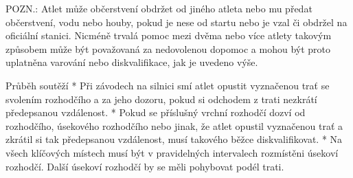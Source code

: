   POZN.: Atlet může občerstvení obdržet od jiného atleta nebo mu předat občerstvení, vodu nebo houby, pokud je nese od startu nebo je vzal či obdržel na oficiální stanici. Nicméně trvalá pomoc mezi dvěma nebo více atlety takovým způsobem může být považovaná za nedovolenou dopomoc a mohou být proto uplatněna varování nebo diskvalifikace, jak je uvedeno výše.
  \enditems

Průběh soutěží
* Při závodech na silnici smí atlet opustit vyznačenou trať se svolením rozhodčího a za jeho dozoru, pokud si odchodem z trati nezkrátí předepsanou vzdálenost.
* Pokud se příslušný vrchní rozhodčí dozví od rozhodčího, úsekového rozhodčího nebo jinak, že atlet opustil vyznačenou trať a zkrátil si tak předepsanou vzdálenost, musí takového běžce diskvalifikovat.
* Na všech klíčových místech musí být v pravidelných intervalech rozmístěni úsekoví rozhodčí. Další úsekoví rozhodčí by se měli pohybovat podél trati.
\enditems

\endinput